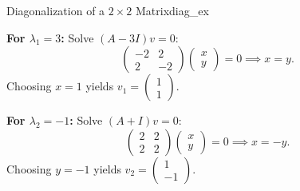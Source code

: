 \documentclass[10pt, letterpaper]{article}
\begin{document}
\begin{example}{Diagonalization of a $2 \times 2$ Matrix}{diag_ex}
    \begin{minipage}[t]{0.48\linewidth}
        \textbf{For $\lambda_1 = 3$:} Solve $(A - 3I)v = 0$:
        \begin{equation*}
            \begin{pmatrix} -2 & 2 \\ 2 & -2 \end{pmatrix}\begin{pmatrix} x \\ y \end{pmatrix} = 0 \implies x = y.
        \end{equation*}
        Choosing $x = 1$ yields $v_1 = \begin{pmatrix} 1 \\ 1 \end{pmatrix}$.
    \end{minipage}\hfill
    \begin{minipage}[t]{0.48\linewidth}
        \textbf{For $\lambda_2 = -1$:} Solve $(A + I)v = 0$:
        \begin{equation*}
            \begin{pmatrix} 2 & 2 \\ 2 & 2 \end{pmatrix}\begin{pmatrix} x \\ y \end{pmatrix} = 0 \implies x = -y.
        \end{equation*}
        Choosing $y = -1$ yields $v_2 = \begin{pmatrix} 1 \\ -1 \end{pmatrix}$.
    \end{minipage}
    \vspace{0.2cm}
    

\end{example}
\end{document}
